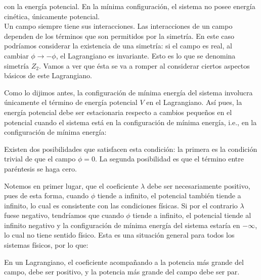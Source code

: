 \noindent con la energía potencial. En la mínima configuración, el sistema no posee energía cinética, únicamente potencial.\\

Un campo siempre tiene sus interacciones. Las interacciones de un campo dependen de los términos que son permitidos por la simetría. En este caso podríamos considerar la existencia de una simetría: si el campo es real, al cambiar $\phi \longrightarrow -\phi$, el Lagrangiano es invariante. Esto es lo que se denomina simetría $Z_2$. Vamos a ver que ésta se va a romper al considerar ciertos aspectos básicos de este Lagrangiano.

Como lo dijimos antes, la configuración de mínima energía del sistema involucra únicamente el término de energía potencial $V$ en el Lagrangiano. Así pues, la energía potencial debe ser estacionaria respecto a cambios pequeños en el potencial cuando el sistema está en la configuración de mínima energía, i.e., en la configuración de mínima energía:
%

Existen dos posibilidades que satisfacen esta condición: la primera es la condición trivial de que el campo $\phi = 0$. La segunda posibilidad es que el término entre paréntesis se haga cero.

Notemos en primer lugar, que el coeficiente $\lambda$ debe ser necesariamente positivo, pues de esta forma, cuando $\phi$ tiende a infinito, el potencial también tiende a infinito, lo cual es consistente con las condiciones físicas. Si por el contrario $\lambda$ fuese negativo, tendríamos que cuando $\phi$ tiende a infinito, el potencial tiende al infinito negativo y la configuración de mínima energía del sistema estaría en $-\infty$, lo cual no tiene sentido físico. Esta es una situación general para todos los sistemas físicos, por lo que:

\begin{cabox}
    En un Lagrangiano, el coeficiente acompañando a la potencia más grande del campo, debe ser positivo, y la potencia más grande del campo debe ser par.
\end{cabox}


